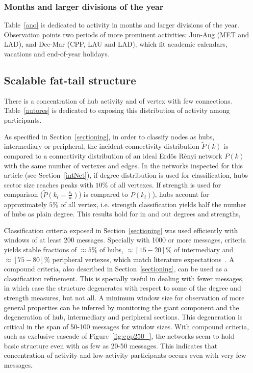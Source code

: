 \documentclass[%
 aip,
 jmp,%
 amsmath,amssymb,
 reprint,%
]{revtex4-1}
\begin{document}
        \subsubsection{Months and larger divisions of the year}
Table~\ref{ano} is dedicated to activity in months and larger divisions of the year.
Observation points two periods of more prominent activities: Jun-Aug (MET and LAD), and Dec-Mar (CPP, LAU and LAD), which fit academic calendars, vacations and end-of-year holidays.

    \subsection{Scalable fat-tail structure}\label{subsec:pih}

There is a concentration of hub activity and of vertex with few connections. Table~\ref{autores} is dedicated to exposing this distribution of activity among participants.

As specified in Section~\ref{sectioning}, in order to classify nodes as hubs, intermediary or peripheral, the incident connectivity distribution $\widetilde{P}(k)$ is compared
to a connectivity distribution of an ideal Erd\"os R\`enyi network $P(k)$ with the same number of vertexes and edges. In the networks inspected for this article (see Section~\ref{intNet}), if degree distribution is used for classification, hubs sector size reaches peaks with $10\%$ of all vertexes. 
 If strength is used for comparison ($\widetilde{P}(k_i=\frac{s_i}{\overline{w}})$) is compared
to $P(k_i)$), hubs account for approximately $5\%$ of all vertex, i.e. strength classification yields half the number of hubs as plain degree. 
This results hold for in and out degrees and strengths, 

Classification criteria exposed in Section~\ref{sectioning} was used efficiently with windows of at least 200 messages. Specially with 1000 or more messages, criteria yields stable fractions of $\approx 5\%$ of hubs, $\approx [15-20]\%$ of intermediary and $\approx [75-80]\%$ peripheral vertexes, which match literature expectations~\cite{secFree}. A compound criteria, also described in Section~\ref{sectioning}, can be used as a classification refinement. This is specially useful in dealing with fewer messages, in which case the structure degenerates with respect to some of the degree and strength measures, but not all.
A minimum window size for observation of more general properties can be inferred by monitoring the giant component and the degeneration of hub, intermediary and peripheral sections. This degeneration is critical in the span of 50-100 messages for window sizes. With compound criteria, such as exclusive cascade of Figure~\ref{fig:cpp250_}, the networks seem to hold basic structure even with as few as 20-50 messages. This indicates that concentration of activity and low-activity participants occurs even with very few messages.
\end{document}
